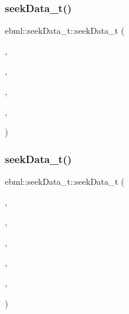 \mbox{\label{classebml_1_1seekData__t_ad64e95299ca85c695b33eb8230cbe48c}} 
\subsubsection{\texorpdfstring{seek\+Data\+\_\+t()}{seekData\_t()}\hspace{0.1cm}{\footnotesize\ttfamily [2/5]}}
{\footnotesize\ttfamily ebml\+::seek\+Data\+\_\+t\+::seek\+Data\+\_\+t (\begin{DoxyParamCaption}\item[{\mbox{\hyperlink{namespaceebml_a86c5f604ddf12a74aa9812e997a58691}{ebml\+I\+D\+\_\+t}}}]{,  }\item[{off\+\_\+t}]{,  }\item[{\mbox{\hyperlink{namespaceebml_a2ccdfb60b23efb51fe07f9d066e23604}{vint\+Width\+\_\+t}}}]{,  }\item[{size\+\_\+t}]{,  }\item[{const \mbox{\hyperlink{namespaceebml_adad533b7705a16bb360fe56380c5e7be}{ebml\+Element\+\_\+sp}} \&}]{ }\end{DoxyParamCaption})}

\mbox{\label{classebml_1_1seekData__t_a4073e066b0e82681eb486e249a5a3ed2}} 
\subsubsection{\texorpdfstring{seek\+Data\+\_\+t()}{seekData\_t()}\hspace{0.1cm}{\footnotesize\ttfamily [3/5]}}
{\footnotesize\ttfamily ebml\+::seek\+Data\+\_\+t\+::seek\+Data\+\_\+t (\begin{DoxyParamCaption}\item[{\mbox{\hyperlink{namespaceebml_a86c5f604ddf12a74aa9812e997a58691}{ebml\+I\+D\+\_\+t}}}]{,  }\item[{off\+\_\+t}]{,  }\item[{\mbox{\hyperlink{namespaceebml_a2ccdfb60b23efb51fe07f9d066e23604}{vint\+Width\+\_\+t}}}]{,  }\item[{size\+\_\+t}]{,  }\item[{const \mbox{\hyperlink{namespaceebml_adad533b7705a16bb360fe56380c5e7be}{ebml\+Element\+\_\+sp}} \&}]{,  }\item[{const \mbox{\hyperlink{namespaceebml_adad533b7705a16bb360fe56380c5e7be}{ebml\+Element\+\_\+sp}} \&}]{ }\end{DoxyParamCaption})}

